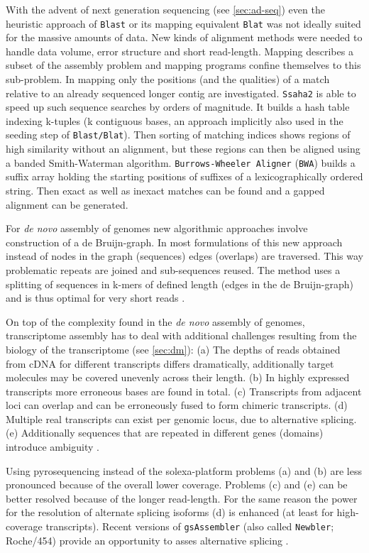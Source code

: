 With the advent of next generation sequencing (see \ref{sec:ad-seq})
even the heuristic approach of \texttt{Blast} or its mapping
equivalent \texttt{Blat} \cite{pmid11932250} was not ideally suited
for the massive amounts of data. New kinds of alignment methods were
needed to handle data volume, error structure and short read-length.
Mapping describes a subset of the assembly problem and mapping
programs confine themselves to this sub-problem. In mapping only the
positions (and the qualities) of a match relative to an already
sequenced longer contig are investigated. \texttt{Ssaha2}
\cite{pmid11591649} is able to speed up such sequence searches by
orders of magnitude. It builds a hash table indexing k-tuples (k
contiguous bases, an approach implicitly also used in the seeding step
of \texttt{Blast/Blat}). Then sorting of matching indices shows
regions of high similarity without an alignment, but these regions can
then be aligned using a banded Smith-Waterman
algorithm. \texttt{Burrows-Wheeler Aligner} (\texttt{BWA})
\cite{pmid20080505} builds a suffix array holding the starting
positions of suffixes of a lexicographically ordered string. Then
exact as well as inexact matches can be found and a gapped alignment
can be generated.

For \textit{de novo} assembly of genomes new algorithmic approaches
involve construction of a de Bruijn-graph. In most formulations of
this new approach instead of nodes in the graph (sequences) edges
(overlaps) are traversed. This way problematic repeats are joined and
sub-sequences reused. The method uses a splitting of sequences in
k-mers of defined length (edges in the de Bruijn-graph) and is thus
optimal for very short reads \cite{pmid18349386}.

On top of the complexity found in the \textit{de novo} assembly of
genomes, transcriptome assembly has to deal with additional challenges
resulting from the biology of the transcriptome (see \ref{sec:dm}):
(a) The depths of reads obtained from cDNA for different transcripts
differs dramatically, additionally target molecules may be covered
unevenly across their length. (b) In highly expressed transcripts more
erroneous bases are found in total. (c) Transcripts from adjacent loci
can overlap and can be erroneously fused to form chimeric
transcripts. (d) Multiple real transcripts can exist per genomic
locus, due to alternative splicing. (e) Additionally sequences that
are repeated in different genes (domains) introduce ambiguity
\cite{pmid21572440}.

Using pyrosequencing instead of the solexa-platform problems (a) and
(b) are less pronounced because of the overall lower
coverage. Problems (c) and (e) can be better resolved because of the
longer read-length. For the same reason the power for the resolution
of alternate splicing isoforms (d) is enhanced (at least for
high-coverage transcripts). Recent versions of \texttt{gsAssembler}
(also called \texttt{Newbler}; Roche/454) provide an opportunity to
asses alternative splicing \cite{pmid21138572}.

